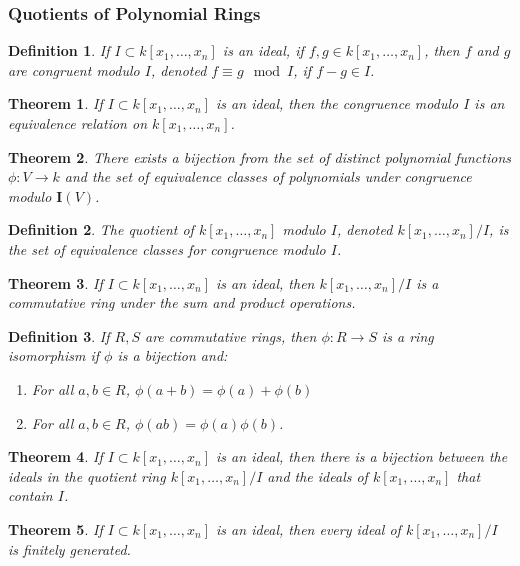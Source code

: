 \documentclass{article}
\theoremstyle{mystyle}
\newtheorem{theorem}{Theorem}[section]
\newtheorem{definition}{Definition}[section]
\begin{document}
\subsubsection{Quotients of Polynomial Rings}
\begin{definition}
If $I\subset k[x_1,\hdots ,x_n]$ is an ideal, if $f,g\in k[x_1,\hdots ,x_n]$, then $f$ and $g$ are congruent modulo $I$, denoted $f \equiv g \mod I$, if $f-g \in I$.
\end{definition}
\begin{theorem}
If $I\subset k[x_1,\hdots ,x_n]$ is an ideal, then the congruence modulo $I$ is an equivalence relation on $k[x_1,\hdots ,x_n]$.
\end{theorem}
\begin{theorem}
There exists a bijection from the set of distinct polynomial functions $\phi:V\rightarrow k$ and the set of equivalence classes of polynomials under congruence modulo $\textbf{I}(V)$.
\end{theorem}
\begin{definition}
The quotient of $k[x_1,\hdots ,x_n]$ modulo $I$, denoted $k[x_1,\hdots ,x_n]/I$, is the set of equivalence classes for congruence modulo $I$.
\end{definition}
\begin{theorem}
If $I\subset k[x_1,\hdots ,x_n]$ is an ideal, then $k[x_1,\hdots ,x_n]/I$ is a commutative ring under the sum and product operations.
\end{theorem}
\begin{definition}
If $R,S$ are commutative rings, then $\phi:R\rightarrow S$ is a ring isomorphism if $\phi$ is a bijection and:
\begin{enumerate}
    \item For all $a,b\in R$, $\phi(a+b) = \phi(a)+\phi(b)$
    \item For all $a,b\in R$, $\phi(ab) = \phi(a)\phi(b)$.
\end{enumerate}
\end{definition}
\begin{theorem}
If $I\subset k[x_1,\hdots ,x_n]$ is an ideal, then there is a bijection between the ideals in the quotient ring $k[x_1,\hdots ,x_n]/I$ and the ideals of $k[x_1,\hdots ,x_n]$ that contain $I$.
\end{theorem}
\begin{theorem}
If $I\subset k[x_1,\hdots ,x_n]$ is an ideal, then every ideal of $k[x_1,\hdots ,x_n]/I$ is finitely generated.
\end{theorem}
\end{document}
